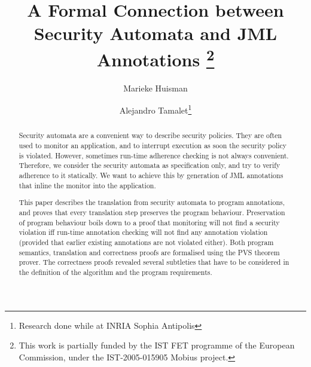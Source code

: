 \documentclass[]{llncs}
\title{A Formal Connection between Security Automata and JML Annotations
\thanks{This work is partially funded by the IST FET
programme of the European Commission, under the IST-2005-015905
\textsf{Mobius} project.}}
\author{Marieke Huisman\inst{1} \and Alejandro Tamalet\inst{2}\thanks{Research done while at INRIA Sophia Antipolis}}
\institute{INRIA Sophia Antipolis, France \and
University of Nijmegen, Netherlands}
\begin{document}
\maketitle
\begin{abstract}
Security automata are a convenient way to describe security
policies. They are often used to monitor an application, and to
interrupt execution as soon the security policy is violated. However,
sometimes run-time adherence checking is not always convenient.
Therefore, we consider the security automata as specification only,
and try to verify adherence to it statically. We want to achieve this by
generation of JML annotations that inline the monitor into the application.

This paper describes the translation from security automata to program
annotations, and proves that every translation step preserves the
program behaviour.
Preservation of program behaviour boils down to a proof
that monitoring will not find a security violation iff run-time
annotation checking will not find any annotation violation (provided
that earlier existing annotations are not violated either).
%
Both program semantics, translation and correctness proofs are
formalised using the PVS theorem prover. The correctness proofs
revealed several subtleties that have to be considered in the
definition of the algorithm and the program requirements.
\end{abstract}











\end{document}
